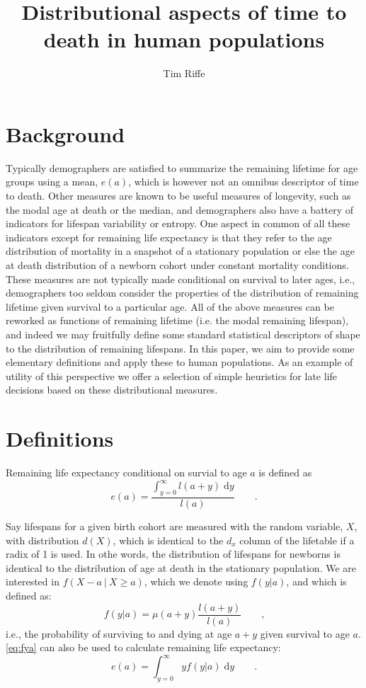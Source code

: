 \documentclass{article}
\newcommand{\dd}{\; \mathrm{d}}
\newcommand{\tc}{\quad\quad\text{,}}
\newcommand{\tp}{\quad\quad\text{.}}
\begin{document}
\title{Distributional aspects of time to death in human populations}
\author{Tim Riffe}
\maketitle

\section{Background}

Typically demographers are satisfied to summarize the remaining lifetime for age
groups using a mean, $e(a)$, which is however not an omnibus descriptor of time
to death. Other measures are known to be useful measures of longevity, such as
the modal age at death or the median, and demographers also have a battery of
indicators for lifespan variability or entropy. One aspect in common of all
these indicators except for remaining life expectancy is that they refer to the
age distribution of mortality in a snapshot of a stationary population or else
the age at death distribution of a newborn cohort under constant mortality
conditions. These measures are not typically made conditional on survival to
later ages, i.e., demographers too seldom consider the properties of the
distribution of remaining lifetime given survival to a particular age. All of
the above measures can be reworked as functions of remaining lifetime (i.e. the
modal remaining lifespan), and indeed we may fruitfully define some standard
statistical descriptors of shape to the distribution of remaining lifespans. In
this paper, we aim to provide some elementary definitions and apply these to
human populations. As an example of utility of this perspective we offer a
selection of simple heuristics for late life decisions based on these
distributional measures.

\section{Definitions}

Remaining life expectancy conditional on survial to age $a$ is defined as
\begin{equation}
e(a) = \frac{\int_{y=0}^\infty l(a+y) \dd y}{l(a)} \tp
\end{equation}

Say lifespans for a given birth cohort are measured with the random variable,
$X$, with distribution $d(X)$, which is identical to the $d_x$
column of the lifetable if a radix of 1 is used. In othe words, the
distribution of lifespans for newborns is identical to the distribution of
age at death in the stationary population. We are interested in $f(X-a ~|~ X \ge
a)$, which we denote using $f(y|a)$, and which is defined as:
\begin{equation}
\label{eq:fya}
f(y|a) = \mu(a+y) \frac{l(a+y)}{l(a)} \tc
\end{equation}
i.e., the probability of surviving to and dying at age $a+y$ given survival to
age $a$. \eqref{eq:fya} can also be used to calculate remaining life expectancy:
\begin{equation}
e(a) = \int _{y=0}^\infty y f(y|a) \dd y \tp
\end{equation}
\end{document}
